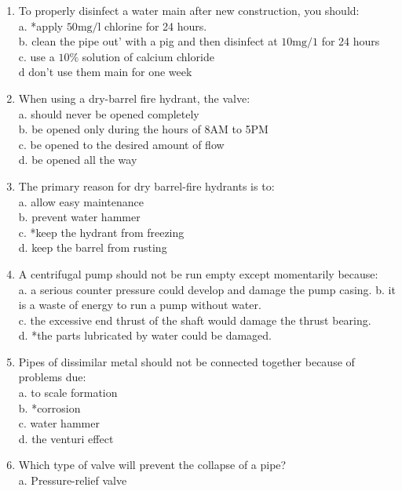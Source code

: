 \begin{enumerate}[1.]
\item To properly disinfect a water main after new construction, you should:\\
a. *apply $50 \mathrm{mg} / \mathrm{l}$ chlorine for 24 hours.\\
b. clean the pipe out' with a pig and then disinfect at $10 \mathrm{mg} / 1$ for 24 hours\\
c. use a $10 \%$ solution of calcium chloride\\
$\mathrm{d}$ don't use them main for one week\\
\item When using a dry-barrel fire hydrant, the valve:\\
a. should never be opened completely\\
b. be opened only during the hours of 8AM to 5PM\\
c. be opened to the desired amount of flow\\
d. be opened all the way\\
\item The primary reason for dry barrel-fire hydrants is to:\\
a. allow easy maintenance\\
b. prevent water hammer\\
c. *keep the hydrant from freezing\\
d. keep the barrel from rusting\\
\item A centrifugal pump should not be run empty except momentarily because:\\
a. a serious counter pressure could develop and damage the pump casing. b. it is a waste of energy to run a pump without water.\\
c. the excessive end thrust of the shaft would damage the thrust bearing.\\
d. *the parts lubricated by water could be damaged.\\
\item Pipes of dissimilar metal should not be connected together because of problems due:\\
a. to scale formation\\
b. *corrosion\\
c. water hammer\\
d. the venturi effect\\
\item Which type of valve will prevent the collapse of a pipe?\\
a. Pressure-relief valve\\

\end{enumerate}
